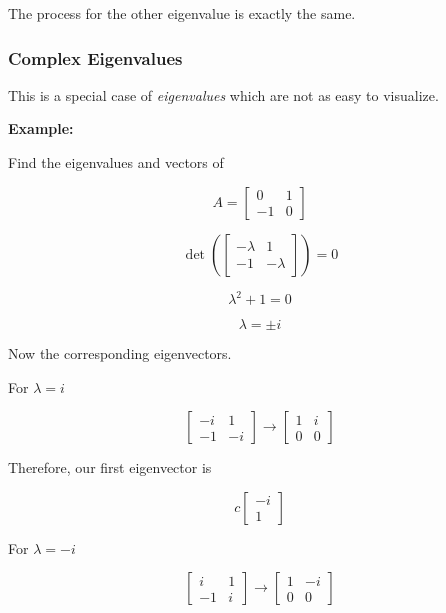 The process for the other eigenvalue is exactly the same.

\subsubsection{Complex Eigenvalues}

This is a special case of \emph{eigenvalues} which are not as easy to visualize.

\textbf{Example:}

Find the eigenvalues and vectors of

\[
    A = \begin{bmatrix}
        0 & 1 \\
        -1 & 0 
    \end{bmatrix}
\]

\[
    \det\left( 
    \begin{bmatrix}
        -\lambda & 1 \\
        -1 & -\lambda
    \end{bmatrix}
    \right) = 0
\]

\[
    \lambda^2 + 1 = 0 
\]

\[
    \lambda = \pm i
\]

Now the corresponding eigenvectors.

For \(\lambda = i\)

\[     
    \begin{bmatrix}
        -i & 1 \\
        -1 & -i
    \end{bmatrix}
    \rightarrow
    \begin{bmatrix}
        1 & i \\
        0 & 0
    \end{bmatrix} 
\]

Therefore, our first eigenvector is 

\[  
    c
    \begin{bmatrix}
        -i \\
        1        
    \end{bmatrix}
\]

For \(\lambda = -i\)

\[     
    \begin{bmatrix}
        i & 1 \\
        -1 & i
    \end{bmatrix}
    \rightarrow
    \begin{bmatrix}
        1 & -i \\
        0 & 0
    \end{bmatrix} 
\]

